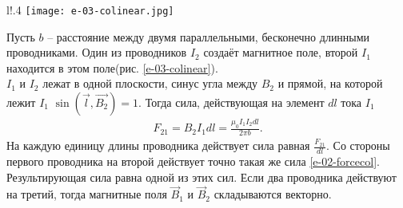 \documentclass[__main__.tex]{subfiles}
\begin{document}
\begin{wrapfigure}{l!}{.4\linewidth}
	\texttt{[image: e-03-colinear.jpg]}
	\caption{Параллельные токи}
	\label{e-03-colinear}
\end{wrapfigure}
Пусть $b$ – расстояние между двумя параллельными, бесконечно длинными проводниками. Один из проводников $I_2$ создаёт магнитное поле, второй $I_1$ находится в этом поле(рис. \ref{e-03-colinear}).\\
$I_1$ и $I_2$ лежат в одной плоскости, синус угла между $B_2$ и прямой, на которой лежит $I_1$ $\sin{(\vec{l}, \vec{B_2})} = 1$. Тогда сила, действующая на элемент $dl$ тока $I_1$
\begin{gather}
	F_{21} = B_{2}I_{1}dl = \frac{\mu_0I_1I_2dl}{2\pi b}.
	\label{e-02-forcecol}
\end{gather}
На каждую единицу длины проводника действует сила равная $\frac{F_{21}}{dl}$. Со стороны первого проводника на второй действует точно такая же сила \ref{e-02-forcecol}.\\
Результирующая сила равна одной из этих сил. Если два проводника действуют на третий, тогда магнитные поля $\vec{B}_1$ и $\vec{B}_2$ складываются векторно.
\end{document}
